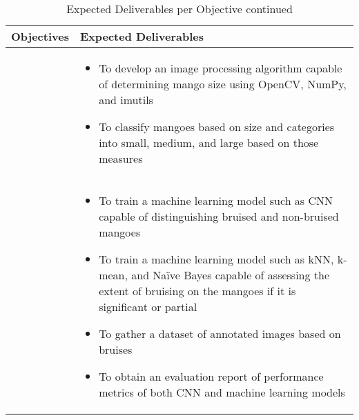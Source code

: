 \begin{table}[!htbp]
	\caption{Expected Deliverables per Objective continued} 	
	\label{tab:expd2} 
	{\centering \scriptsize
		\begin{tabular}{p{}|p{}}
			\hline 
			\hline 
			\textbf{Objectives} & 
			\textbf{Expected Deliverables}\\ 
			\hline 
			\Paste{SO6} & 
			\begin{minipage}{0.55\textwidth}
				\vspace{10pt}
				\begin{itemize}
					\item To develop an image processing algorithm capable of determining mango 
					size using OpenCV, NumPy, and imutils
					\item To classify mangoes based on size and categories into small, medium, 
					and large based on those measures
				\end{itemize}
			\end{minipage} \\ \hline

			\Paste{SO7} & 
			\begin{minipage}{0.55\textwidth}
				\vspace{10pt}
				\begin{itemize}
					\item To train a machine learning model such as 
					CNN capable of distinguishing bruised and non-bruised mangoes
					\item To train a machine learning model such as kNN, k-mean, and Naïve Bayes 
					capable of assessing the extent of bruising on the mangoes if it is significant or partial
					\item To gather a dataset of annotated images based on bruises
					\item To obtain an evaluation report of performance metrics of both CNN and machine learning models
				\end{itemize}
			\end{minipage} \\ \hline
		\end{tabular}
	}
\end{table}


